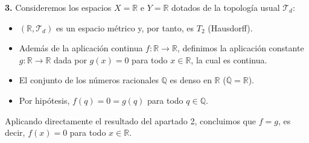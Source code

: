 \begin{sol}
\vspace{0.3cm}
\noindent\textbf{3.} Consideremos los espacios $X = \mathbb{R}$ e $Y = \mathbb{R}$ dotados de la topología usual $\mathcal{T}_d$:
\begin{itemize}
    \item $(\mathbb{R}, \mathcal{T}_d)$ es un espacio métrico y, por tanto, es $T_2$ (Hausdorff).
    \item Además de la aplicación continua $f: \mathbb{R} \to \mathbb{R}$, definimos la aplicación constante $g: \mathbb{R} \to \mathbb{R}$ dada por $g(x) = 0$ para todo $x \in \mathbb{R}$, la cual es continua.
    \item El conjunto de los números racionales $\mathbb{Q}$ es denso en $\mathbb{R}$ ($\overline{\mathbb{Q}} = \mathbb{R}$).
    \item Por hipótesis, $f(q) = 0 = g(q)$ para todo $q \in \mathbb{Q}$.
\end{itemize}
Aplicando directamente el resultado del apartado 2, concluimos que $f = g$, es decir, $f(x) = 0$ para todo $x \in \mathbb{R}$.
\end{sol}
  